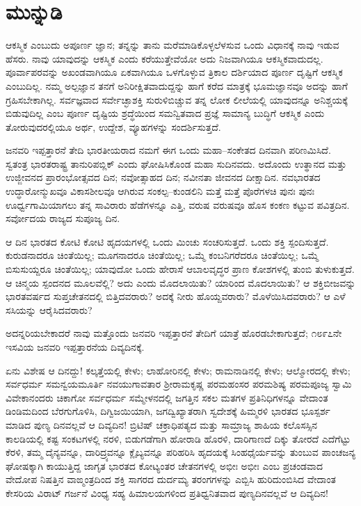 
\chapter*{ಮುನ್ನುಡಿ}

ಆಕಸ್ಮಿಕ ಎಂಬುದು ಅಪೂರ್ಣ ಜ್ಞಾನ; ತನ್ನನ್ನು ತಾನು ಮರೆಮಾಡಿಕೊಳ್ಳಲೆಳಸುವ ಒಂದು ವಿಧಾನಕ್ಕೆ ನಾವು ಇಡುವ ಹೆಸರು. ನಾವು ಯಾವುದನ್ನು ಆಕಸ್ಮಿಕ ಎಂದು ಕರೆಯುತ್ತೇವೆಯೋ ಅದು ನಿಜವಾಗಿಯೂ ಆಕಸ್ಮಿಕವಾದುದಲ್ಲ. ಪೂರ್ವಾಪರವನ್ನು ಅಖಂಡವಾಗಿಯೂ ಏಕವಾಗಿಯೂ ಒಳಗೊಳ್ಳುವ ತ್ರಿಕಾಲ ದರ್ಶಿಯಾದ ಪೂರ್ಣ ದೃಷ್ಟಿಗೆ ಆಕಸ್ಮಿಕ ಎಂಬುದಿಲ್ಲ. ನಮ್ಮ ಅಲ್ಪಜ್ಞಾನ ತನಗೆ ಅನಿರೀಕ್ಷಿತವಾದುದ್ದನ್ನು ಹಾಗೆ ಕರೆದ ಮಾತ್ರಕ್ಕೆ ಭೂಮಜ್ಞಾನವೂ ಅದನ್ನು ಹಾಗೆ ಗ್ರಹಿಸಬೇಕಾಗಿಲ್ಲ. ಸರ್ವಜ್ಞವಾದ ಸರ್ವೇಚ್ಛಾಶಕ್ತಿ ಸುರುಳಿಬಿಚ್ಚುವ ತನ್ನ ಲೋಕ ಲೀಲೆಯಲ್ಲಿ ಯಾವುದನ್ನೂ ಅನಿಶ್ಚಯಕ್ಕೆ ಬಿಡುವುದಿಲ್ಲ ಎಂಬ ಪೂರ್ಣ ದೃಷ್ಟಿಯ ಶ್ರದ್ಧೆಯಿಂದ ಸಮನ್ವಿತವಾದ ಪ್ರಜ್ಞೆ ಸಾಮಾನ್ಯ ಬುದ್ಧಿಗೆ ಆಕಸ್ಮಿಕ ಎಂದು ತೋರುವುದರಲ್ಲಿಯೂ ಅರ್ಥ, ಉದ್ದೇಶ, ವ್ಯೂಹಗಳನ್ನು ಸಂದರ್ಶಿಸುತ್ತದೆ.

ಜನವರಿ ಇಪ್ಪತ್ತಾರನೆ ತೇದಿ ಭಾರತೀಯರಾದ ನಮಗೆ ಈಗ ಒಂದು ಮಹಾ–ಸಂಕೇತದ ದಿನವಾಗಿ ಪರಿಣಮಿಸಿದೆ. ಸ್ವತಂತ್ರ ಭಾರತರಾಷ್ಟ್ರ ತಾನುರಿಪಬ್ಲಿಕ್​ ಎಂದು ಘೋಷಿಸಿಕೊಂಡ ಮಹಾ ಸುದಿನವದು. ಅದೊಂದು ಉತ್ಥಾನದ ಮತ್ತು ಉಜ್ಜೀವನದ ಪ್ರಾರಂಭೋತ್ಸವದ ದಿನ; ನವೋತ್ಸಾಹದ ದಿನ; ನವೀನತಾ ಜೀವನದ ದೀಕ್ಷಾದಿನ. ನವಭಾರತದ ಉದ್ಧಾರೋನ್ಮುಖವೂ ವಿಕಾಸಶೀಲವೂ ಆಗಿರುವ ಸಂಕಲ್ಪ–ಕುಂಡಲಿನಿ ಮತ್ತೆ ಮತ್ತೆ ಪೊರೆಗಳಚಿ ಪುನಃ ಪುನಃ ಊರ್ಧ್ವಗಾಮಿಯಾಗಲು ತನ್ನ ಸಾವಿರಾರು ಹೆಡೆಗಳನ್ನೂ ಎತ್ತಿ, ವರುಷ ವರುಷವೂ ಹೊಸ ಕಂಕಣ ಕಟ್ಟುವ ಪವಿತ್ರದಿನ. ಸರ್ವೋದಯ ರಾಜ್ಯದ ಸುಪೂಜ್ಯ ದಿನ.

ಆ ದಿನ ಭಾರತದ ಕೋಟಿ ಕೋಟಿ ಹೃದಯಗಳಲ್ಲಿ ಒಂದು ಮಿಂಚು ಸಂಚರಿಸುತ್ತದೆ. ಒಂದು ಶಕ್ತಿ ಸ್ಪಂದಿಸುತ್ತದೆ. ಕುರುಡನಾದರೂ ಚಿಂತೆಯಿಲ್ಲ; ಮೂಗನಾದರೂ ಚಿಂತೆಯಿಲ್ಲ; ಒಮ್ಮೆ ಕಂಬನಿಗರೆದರೂ ಚಿಂತೆಯಿಲ್ಲ; ಒಮ್ಮೆ ಬಿಸುಸುಯ್ದರೂ ಚಿಂತೆಯಿಲ್ಲ; ಯಾವುದೋ ಒಂದು ಹೇರಾಸೆ ಆಬಾಲವೃದ್ಧರ ಪ್ರಾಣ ಕೋಶಗಳಲ್ಲಿ ತುಂಬಿ ತುಳುಕುತ್ತದೆ. ಆ ಚಿನ್ಮಯ ಸ್ಪಂದನದ ಮೂಲವೆಲ್ಲಿ? ಅದು ಎಂದು ಮೊದಲಾಯಿತು? ಯಾರಿಂದ ಮೊದಲಾಯಿತು? ಆ ಶಕ್ತಿಬೀಜವನ್ನು ಭಾರತವರ್ಷದ ಸುಪ್ತಚೇತನದಲ್ಲಿ ಬಿತ್ತಿದವರಾರು? ಅದಕ್ಕೆ ನೀರು ಹೊಯ್ದವರಾರು? ಮೊಳೆಯಿಸಿದವರಾರು? ಆ ಎಳೆ ಸಸಿಯನ್ನು ಆರೈಸಿದವರಾರು?

ಅದನ್ನರಿಯಬೇಕಾದರೆ ನಾವು ಮತ್ತೊಂದು ಜನವರಿ ಇಪ್ಪತ್ತಾರನೆ ತೇದಿಗೆ ಯಾತ್ರೆ ಹೊರಡಬೇಕಾಗುತ್ತದೆ; ೧೮೯೭ನೇ ಇಸವಿಯ ಜನವರಿ ಇಪ್ಪತ್ತಾರನೆಯ ದಿವ್ಯದಿನಕ್ಕೆ.

ಏನು ವಿಶೇಷ ಆ ದಿನದ್ದು! ಕಲ್ಕತ್ತೆಯಲ್ಲಿ ಕೇಳು; ಲಾಹೋರಿನಲ್ಲಿ ಕೇಳು; ರಾಮನಾಡಿನಲ್ಲಿ ಕೇಳು; ಆಲ್ಮೋರದಲ್ಲಿ ಕೇಳು; ಸರ್ವಧರ್ಮ ಸಮನ್ವಯಮೂರ್ತಿ ನವಯುಗಾವತಾರ ಶ‍್ರೀರಾಮಕೃಷ್ಣ ಪರಮಹಂಸರ ಪರಮಶಿಷ್ಯ ಪರಮಪೂಜ್ಯ ಸ್ವಾಮಿ ವಿವೇಕಾನಂದರು ಚಿಕಾಗೋ ಸರ್ವಧರ್ಮ ಸಮ್ಮೇಳನದಲ್ಲಿ ಜಗತ್ತಿನ ಸಕಲ ಮತಗಳ ಪ್ರತಿನಿಧಿಗಳನ್ನೂ ವೇದಾಂತ ಡಿಂಡಿಮದಿಂದ ಬೆರಗುಗೊಳಿಸಿ, ದಿಗ್ವಿಜಯಿಯಾಗಿ, ಜಗದ್ವಿಖ್ಯಾತರಾಗಿ ಸ್ವದೇಶಕ್ಕೆ ಹಿಮ್ಮರಳಿ ಭಾರತದ ಭೂಸ್ಪರ್ಶ ಮಾಡಿದ ಪುಣ್ಯ ದಿನವಲ್ಲವೆ ಆ ದಿವ್ಯದಿನ! ಬ್ರಿಟಿಷ್​ ಚಕ್ರಾಧಿಪತ್ಯದ ಮತ್ತು ಸಾಮ್ರಾಜ್ಯ ಶಾಹಿಯ ಕಲೊಸಸ್ಸಿನ ಕಾಲಡಿಯಲ್ಲಿ ಕಷ್ಟ ಸಂಕಟಗಳಲ್ಲಿ ನರಳಿ, ಬಿಡುಗಡೆಗಾಗಿ ಹೋರಾಡಿ ಹೊರಳಿ, ದಾರಿಗಾಣದೆ ದಿಕ್ಕು ತೋರದೆ ಎದೆಗೆಟ್ಟು ಕೆರಳಿ, ತಮ್ಮ ದೈನ್ಯವನ್ನೂ, ದಾರಿದ್ರ್ಯವನ್ನೂ ಕ್ಲೈಬ್ಯವನ್ನೂ ಪರಿಹರಿಸಿ ಹೃದಯಕ್ಕೆ ಸಿಂಹಧೈರ್ಯವನ್ನು ತುಂಬುವ ಪಾಂಚಜನ್ಯ ಘೋಷಕ್ಕಾಗಿ ಕಾಯುತ್ತಿದ್ದ ಜಾಗೃತ ಭಾರತದ ಕೋಟ್ಯಂತರ ಚೇತನಗಳಲ್ಲಿ ಅಭೀಃ ಅಭೀಃ ಎಂಬ ಪ್ರಚಂಡವಾದ ವೇದೋಪ ನಿಷತ್ತಿನ ವಾಙ್ಮಂತ್ರದಿಂದ ಶಕ್ತಿ ಸಾಗರದ ದುರ್ದಮ್ಯ ತರಂಗಗಳನ್ನು ಎಬ್ಬಿಸಿ ಹುರಿದುಂಬಿಸಿದ ವೇದಾಂತ ಕೇಸರಿಯ ವಿರಾಟ್​ ಗರ್ಜನೆ ವಿಂಧ್ಯ ಸಹ್ಯ ಹಿಮಾಲಯಗಳಿಂದ ಪ್ರತಿಧ್ವನಿತವಾದ ಪುಣ್ಯದಿನವಲ್ಲವೆ ಆ ದಿವ್ಯದಿನ!

